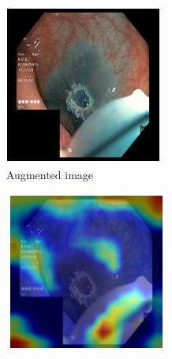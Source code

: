 \begin{figure}[t]
     \centering
     \begin{subfigure}[t]{0.3\textwidth}
         \centering
         \includegraphics[width=\textwidth]{methodology/figures/sal4.png}
         \caption{Augmented image}
         \label{fig:sal4}
     \end{subfigure}
     \hfill
     \begin{subfigure}[t]{0.3\textwidth}
         \centering
         \includegraphics[width=\textwidth]{methodology/figures/sal5.png}

\end{subfigure}
\end{figure}

